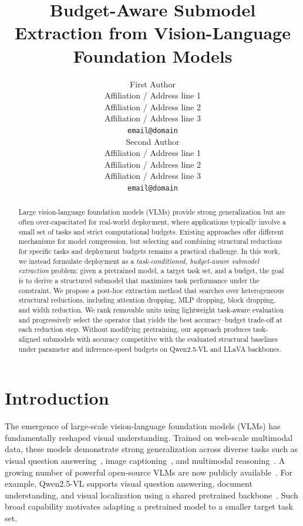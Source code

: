 \documentclass[11pt]{article}
\title{Budget-Aware Submodel Extraction from Vision-Language Foundation Models}
\author{First Author \\
  Affiliation / Address line 1 \\
  Affiliation / Address line 2 \\
  Affiliation / Address line 3 \\
  \texttt{email@domain} \\\And
  Second Author \\
  Affiliation / Address line 1 \\
  Affiliation / Address line 2 \\
  Affiliation / Address line 3 \\
  \texttt{email@domain} \\}
\begin{document}
\maketitle

\begin{abstract}
Large vision-language foundation models (VLMs) provide strong generalization but are often over-capacitated for real-world deployment, where applications typically involve a small set of tasks and strict computational budgets. Existing approaches offer different mechanisms for model compression, but selecting and combining structural reductions for specific tasks and deployment budgets remains a practical challenge.
In this work, we instead formulate deployment as a \textit{task-conditioned, budget-aware submodel extraction} problem: given a pretrained model, a target task set, and a budget, the goal is to derive a structured submodel that maximizes task performance under the constraint. 
We propose a post-hoc extraction method that searches over heterogeneous structural reductions, including attention dropping, MLP dropping, block dropping, and width reduction. We rank removable units using lightweight task-aware evaluation and progressively select the operator that yields the best accuracy–budget trade-off at each reduction step. 
Without modifying pretraining, our approach produces task-aligned submodels with accuracy competitive with the evaluated structural baselines under parameter and inference-speed budgets on Qwen2.5-VL and LLaVA backbones.
\end{abstract}


\section{Introduction}
\label{sec:intro}
The emergence of large-scale vision-language foundation models (VLMs) has fundamentally reshaped visual understanding. 
Trained on web-scale multimodal data, these models demonstrate strong generalization across diverse tasks such as 
visual question answering~\cite{antol2015vqa}, image captioning~\cite{hossain2019comprehensive,you2016image}, and multimodal reasoning~\cite{chen2024spatialvlm}. A growing number of powerful open-source VLMs are now publicly available~\cite{bai2025qwen3,liu2023visual}. For example, Qwen2.5-VL supports visual question answering, document understanding, and visual localization using a shared pretrained backbone~\cite{xu2025qwen25vltechnicalreport}. Such broad capability motivates adapting a pretrained model to a smaller target task set.
\end{document}
